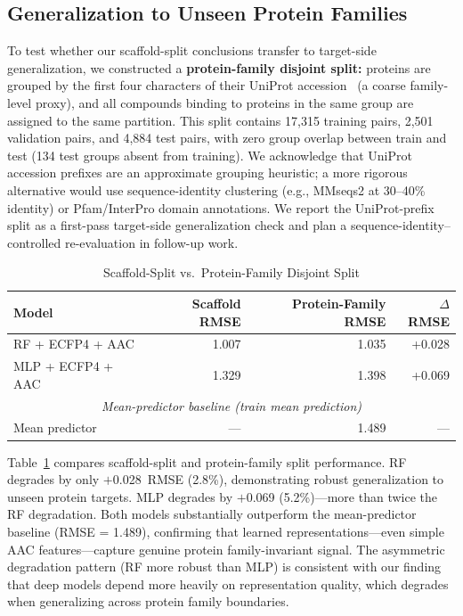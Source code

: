 \documentclass[11pt,twocolumn,a4paper]{article}
\begin{document}
\subsection{Generalization to Unseen Protein Families}
\label{sec:protein_split}

To test whether our scaffold-split conclusions transfer to target-side generalization, we constructed a \textbf{protein-family disjoint split:} proteins are grouped by the first four characters of their UniProt accession~\cite{uniprot2023} (a coarse family-level proxy), and all compounds binding to proteins in the same group are assigned to the same partition. This split contains 17,315 training pairs, 2,501 validation pairs, and 4,884 test pairs, with zero group overlap between train and test (134 test groups absent from training). We acknowledge that UniProt accession prefixes are an approximate grouping heuristic; a more rigorous alternative would use sequence-identity clustering (e.g., MMseqs2 at 30--40\% identity) or Pfam/InterPro domain annotations. We report the UniProt-prefix split as a first-pass target-side generalization check and plan a sequence-identity--controlled re-evaluation in follow-up work.

\begin{table}[t]
\centering
\caption{Scaffold-Split vs.\ Protein-Family Disjoint Split}
\label{tab:protein_split}
\begin{tabular}{lrrr}
\toprule
\textbf{Model} & \textbf{Scaffold RMSE} & \textbf{Protein-Family RMSE} & $\Delta$\textbf{RMSE} \\
\midrule
RF + ECFP4 + AAC       & 1.007 & 1.035 & +0.028 \\
MLP + ECFP4 + AAC      & 1.329 & 1.398 & +0.069 \\
\midrule
\multicolumn{4}{c}{\textit{Mean-predictor baseline (train mean prediction)}} \\
Mean predictor         & ---   & 1.489 & --- \\
\bottomrule
\end{tabular}
\end{table}

Table~\ref{tab:protein_split} compares scaffold-split and protein-family split performance. RF degrades by only $+$0.028~RMSE (2.8\%), demonstrating robust generalization to unseen protein targets. MLP degrades by $+$0.069 (5.2\%)---more than twice the RF degradation. Both models substantially outperform the mean-predictor baseline (RMSE = 1.489), confirming that learned representations---even simple AAC features---capture genuine protein family-invariant signal. The asymmetric degradation pattern (RF more robust than MLP) is consistent with our finding that deep models depend more heavily on representation quality, which degrades when generalizing across protein family boundaries.
\end{document}
